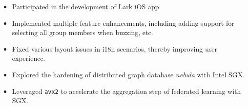 \documentclass{resume}
\newcommand{\en}[1]{#1}
\newcommand{\zh}[1]{}
\begin{document}
\en{}
\zh{\datedsubsection{\textbf{\href{https://www.bytedance.com/}{字节跳动}}}{04/2020 -- 07/2020}}
\en{}
\zh{\role{iOS 研发实习}{飞书}}
\begin{itemize}
      \item \en{Participated in the development of Lark iOS app.}
            \zh{参与飞书 iOS 端业务研发，负责开发新功能和维护现有功能。}
      \item \en{
                  Implemented multiple feature enhancements, 
                  including adding support for selecting all group members when buzzing, etc.
            }
            \zh{实现了多项功能改进，包括提升文件传输大小限制、群加急选人支持全选等功能。}
      \item \en{Fixed various layout issues in i18n scenarios, thereby improving user experience.}
            \zh{参与品质优化相关项目，修复了多个国际化场景下 iOS 端的布局问题，提升了用户体验。}
\end{itemize}

\en{}
\zh{\datedsubsection{\textbf{清华大学信息技术研究院}}{10/2019 -- 04/2020}}
\en{}
\zh{\role{科研实习}{网络安全实验室}}
\begin{itemize}
      \item \en{Explored the hardening of distributed graph database \textit{nebula} with Intel SGX.}
            \zh{探索使用 Intel SGX 技术对分布式图数据库 \textit{nebula} 进行加固。}
      \item \en{Leveraged \texttt{avx2} to accelerate the aggregation step of federated learning with SGX.}
            \zh{利用 \texttt{avx2} 指令集加速了 SGX 技术下联邦学习的模型聚合。}
\end{itemize}
\end{document}
